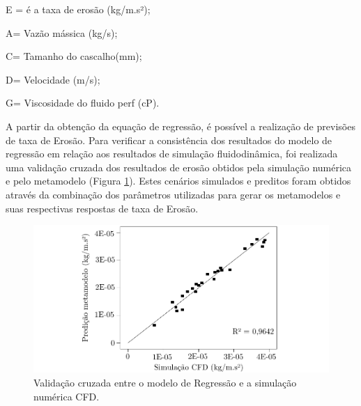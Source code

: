 E = é a taxa de erosão (kg/m.s²);

A= Vazão mássica (kg/s);

C= Tamanho do cascalho(mm);

D= Velocidade (m/s);

G= Viscosidade do fluido perf (cP). 
\vspace{1.2cm}



A partir da obtenção da equação de regressão, é possível a realização de previsões de taxa de Erosão. Para verificar a consistência dos resultados do modelo de regressão em relação aos resultados de simulação fluidodinâmica, foi realizada uma validação cruzada dos resultados de erosão obtidos pela simulação numérica e pelo metamodelo (Figura \ref{fig:validcruzada}). Estes cenários simulados e preditos foram obtidos através da combinação dos parâmetros utilizadas para gerar os metamodelos e suas respectivas respostas de taxa de Erosão. 

\begin{figure}[H] 
    \centering  
    \includegraphics{Figuras/crossplotbehkhen.pdf}  
    \caption{Validação cruzada entre o modelo de Regressão e a simulação numérica CFD.}  
    \label{fig:validcruzada}  
\end{figure}

